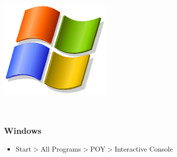 {\begin{flushleft}
	\begin{minipage}[c]{0.074\textwidth}
	   	\includegraphics[width=\textwidth]{doc/figures/figlogowindows.jpg}
	\end{minipage}
	\,
	\begin{minipage}[t]{0.88\textwidth}
		\subsubsection*{Windows}
	\end{minipage}
			\begin{itemize}
                \item{Start$>$All Programs$>$POY$>$Interactive Console}
			\end{itemize}


\end{flushleft}}
